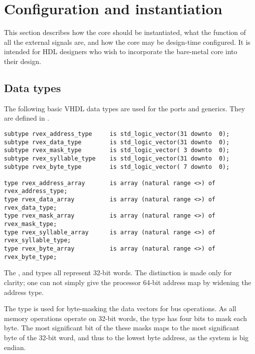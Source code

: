 
\clearpage
\section{Configuration and instantiation}
\label{sec:core-ug-cfg-inst}

This section describes how the core should be instantiated, what the function of
all the external signals are, and how the core may be design-time configured. It
is intended for HDL designers who wish to incorporate the bare-metal core into
their design. 

\subsection{Data types}
\label{sec:core-ug-cfg-inst-types}

The following basic VHDL data types are used for the ports and generics. They
are defined in .

\begin{lstlisting}[numbers=none]
subtype rvex_address_type     is std_logic_vector(31 downto  0);
subtype rvex_data_type        is std_logic_vector(31 downto  0);
subtype rvex_mask_type        is std_logic_vector( 3 downto  0);
subtype rvex_syllable_type    is std_logic_vector(31 downto  0);
subtype rvex_byte_type        is std_logic_vector( 7 downto  0);

type rvex_address_array       is array (natural range <>) of rvex_address_type;
type rvex_data_array          is array (natural range <>) of rvex_data_type;
type rvex_mask_array          is array (natural range <>) of rvex_mask_type;
type rvex_syllable_array      is array (natural range <>) of rvex_syllable_type;
type rvex_byte_array          is array (natural range <>) of rvex_byte_type;
\end{lstlisting}

\noindent The ,  and  types all 
represent 32-bit words. The distinction is made only for clarity; one can not 
simply give the \rvex{} processor 64-bit address map by widening the address 
type.

The  type is used for byte-masking the data vectors for bus
operations. As all memory operations operate on 32-bit words, the 
type has four bits to mask each byte. The most significant bit of the these
masks maps to the most significant byte of the 32-bit word, and thus to the
lowest byte address, as the \rvex{} system is big endian.

